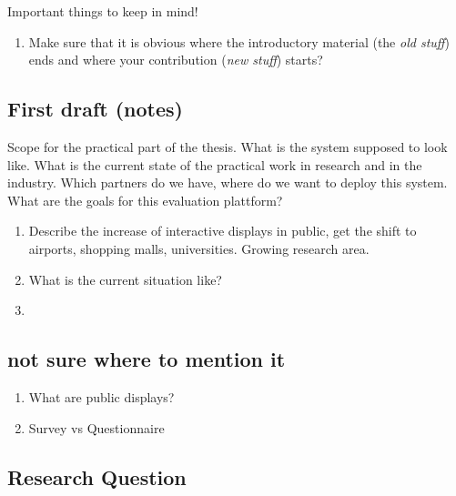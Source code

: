 Important things to keep in mind!

  \begin{enumerate}
  \item Make sure that it is obvious where the introductory material (the \textit{old stuff}) ends and where your contribution (\textit{new stuff}) starts?
  \end{enumerate}






\subsection{First draft (notes)}

	Scope for the practical part of the thesis. What is the system supposed to look like. What is the current state of the practical work in research and in the industry. Which partners do we have, where do we want to deploy this system. What are the goals for this evaluation plattform?



	\begin{enumerate}
	\item Describe the increase of interactive displays in public, get the shift to airports, shopping malls, universities. Growing research area.
	
	\item What is the current situation like?

	\item 
	\end{enumerate}





\subsection{not sure where to mention it}

	\begin{enumerate}
	\item What are public displays?
	\item Survey vs Questionnaire
	\end{enumerate}


	\subsection{Research Question}



